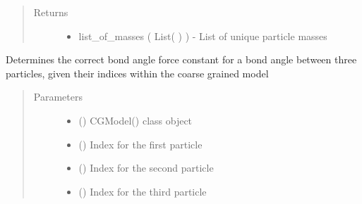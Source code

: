 \documentclass[letterpaper,12pt,english,openany,oneside]{sphinxmanual}
\begin{document}
\begin{fulllineitems}
\begin{fulllineitems}
\begin{quote}
\begin{description}
\item[{Returns}] \leavevmode
\begin{itemize}
\item {} 
list\_of\_masses ( List(  ) ) - List of unique particle masses

\end{itemize}


\end{description}\end{quote}

\end{fulllineitems}


\begin{fulllineitems}
\label{\detokenize{cg_model:cg_model.cgmodel.CGModel.get_bond_angle_force_constant}}
Determines the correct bond angle force constant for a bond angle between three particles, given their indices within the coarse grained model
\begin{quote}\begin{description}
\item[{Parameters}] \leavevmode\begin{itemize}
\item {} 
 () \textendash{} CGModel() class object

\item {} 
 () \textendash{} Index for the first particle

\item {} 
 () \textendash{} Index for the second particle

\item {} 
 () \textendash{} Index for the third particle


\end{itemize}
\end{description}
\end{quote}
\end{fulllineitems}
\end{fulllineitems}
\end{document}
